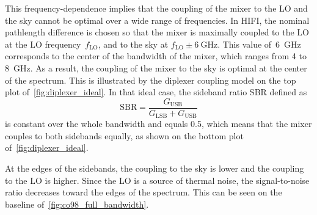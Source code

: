 This frequency-dependence implies that the coupling of the mixer to the LO and the sky cannot be optimal over a wide range of frequencies.
In HIFI, the nominal pathlength difference is chosen so that the mixer is maximally coupled to the LO at the LO frequency~$f_\text{LO}$,
and to the sky at $f_\text{LO} \pm \SI{6}{\giga\hertz}$.
This value of~\SI{6}{\giga\hertz} corresponds to the center of the bandwidth of the mixer, which ranges from \num{4} to \SI{8}{\giga\hertz}.
As a result, the coupling of the mixer to the sky is optimal at the center of the spectrum.
This is illustrated by the diplexer coupling model on the top plot of~\cref{fig:diplexer_ideal}.
In that ideal case, the sideband ratio SBR defined as
\begin{equation}
    \text{SBR} =
    \frac{
        G_\text{USB}
    }{
        G_\text{LSB} + G_\text{USB}
    }
\end{equation}
is constant over the whole bandwidth and equals \num{0.5}, which means that the mixer couples to both sidebands equally, as shown on the bottom plot of~\cref{fig:diplexer_ideal}.

At the edges of the sidebands, the coupling to the sky is lower and the coupling to the LO is higher.
Since the LO is a source of thermal noise, the signal-to-noise ratio decreases toward the edges of the spectrum.
This can be seen on the baseline of~\cref{fig:co98_full_bandwidth}.

